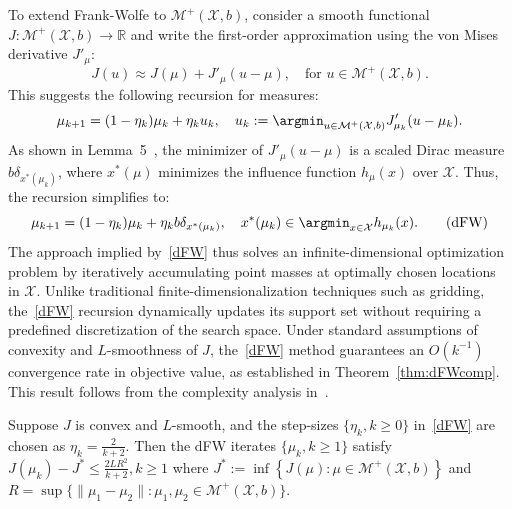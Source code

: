 \documentclass[stsy,sglanonrev]{informs4}
\begin{document}
To extend Frank-Wolfe to $\mathcal{M}^+(\mathcal{X},b)$, consider a smooth functional \(J : \mathcal{M}^+(\mathcal{X},b) \to \mathbb{R}\)  and write the first-order approximation using the von Mises derivative \( J'_\mu \):
\[
J(u) \approx J(\mu) + J'_\mu(u - \mu), \quad \text{for } u \in \mathcal{M}^+(\mathcal{X},b).
\]
This suggests the following recursion for measures:
\[
\mu_{k+1} = (1 - \eta_k)\mu_k + \eta_k u_k, \quad u_k := \argmin_{u \in \mathcal{M}^+(\mathcal{X},b)} J'_{\mu_k}(u - \mu_k).
\]
As shown in Lemma~5~\cite{yu2024det}, the minimizer of \(J'_\mu(u - \mu)\) is a scaled Dirac measure $b\delta_{x^*(\mu_k)}$, where \(x^*(\mu)\) minimizes the influence function \(h_\mu(x)\) over $\mathcal{X}$.
Thus, the recursion simplifies to:
\begin{equation}\label{dFW}
\mu_{k+1} = (1 - \eta_k)\mu_k + \eta_k b\delta_{x^*(\mu_k)}, \quad x^*(\mu_k) \in \argmin_{x \in \mathcal{X}} h_{\mu_k}(x). \tag{dFW}
\end{equation}
The approach implied by~\eqref{dFW} thus solves an infinite-dimensional optimization problem by iteratively accumulating point masses at optimally chosen locations in \(\mathcal{X}\). Unlike traditional finite-dimensionalization techniques such as gridding, the~\eqref{dFW} recursion dynamically updates its support set without requiring a predefined discretization of the search space. Under standard assumptions of convexity and \(L\)-smoothness of \(J\), the~\eqref{dFW} method guarantees an \(O(k^{-1})\) convergence rate in objective value, as established in Theorem~\ref{thm:dFWcomp}. This result follows from the complexity analysis in~\cite{yu2024det}. 

\begin{theorem}\label{thm:dFWcomp}
Suppose $J$ is convex and $L$-smooth, and the step-sizes $\{\eta_k, k \geq 0\}$ in~\eqref{dFW} are chosen as $\eta_k = \frac{2}{k+2}.$ Then the dFW iterates $\{\mu_k, k \geq 1\}$ satisfy $J(\mu_k) - J^* \leq \frac{2LR^2}{k+2}, k \geq 1$ where $J^* := \inf\left\{J(\mu) : \mu \in \mathcal{M}^+(\mathcal{X},b)\right\}$ and \(R = \sup\{\|\mu_1-\mu_2\| : \mu_1, \mu_2 \in \mathcal{M}^+(\mathcal{X},b)\}\).
\end{theorem}
\end{document}
